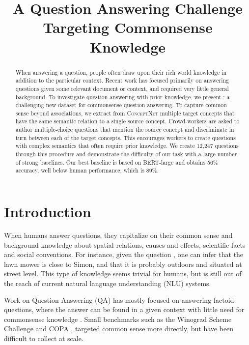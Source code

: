 \title{A Question Answering Challenge Targeting Commonsense Knowledge}

\begin{abstract}
When answering a question, people often draw upon their rich world knowledge in addition to the particular context. Recent work has focused primarily on answering questions given some relevant document or context, and required very little general background. To investigate question answering with prior knowledge, we present \csqa{}: a challenging new dataset for commonsense question answering. To capture common sense beyond associations, we extract from \textsc{ConceptNet} \cite{speer2017conceptnet} multiple target concepts that have the same semantic relation to a single source concept. Crowd-workers are asked to author multiple-choice questions that mention the source concept and discriminate in turn between each of the target concepts. This encourages workers to create questions with complex semantics that often require prior knowledge. We create 12,247 questions through this procedure and demonstrate the difficulty of our task with a large number of strong baselines. Our best baseline is based on BERT-large \cite{devlin2018BERT} and obtains 56\% accuracy, well below human performance, which is 89\%.
\end{abstract}

\section{Introduction}
\label{introduction}

When humans answer questions, they capitalize on their common sense and background knowledge about spatial relations, causes and effects, scientific facts and social conventions. For instance, given the question , one can infer that the lawn mower is close to Simon, and that it is probably outdoors and situated at street level. This type of knowledge seems trivial for humans, but is still out of the reach of current natural language understanding (NLU) systems.

Work on Question Answering (QA) has mostly focused on answering factoid questions, where the answer can be found in a given context with little need for commonsense knowledge \cite{hermann2015teaching,rajpurkar2016squad,nguyen2016ms,joshi2017triviaqa}. Small benchmarks such as the Winograd Scheme Challenge \cite{Levesque2011TheWS} and COPA \cite{roemmele2011choice}, targeted common sense more directly, but have been difficult to collect at scale.

